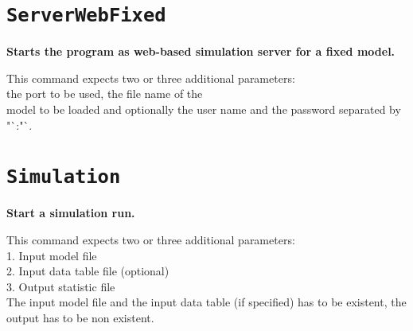 \section{\texttt{ServerWebFixed}}

\textbf{Starts the program as web-based simulation server for a fixed model.}

This command expects two or three additional parameters:\\
the port to be used, the file name of the\\
model to be loaded and optionally the user name and the password separated by "`:"`.

\section{\texttt{Simulation}}

\textbf{Start a simulation run.}

This command expects two or three additional parameters:\\
1. Input model file\\
2. Input data table file (optional)\\
3. Output statistic file\\
The input model file and the input data table (if specified) has to be existent, the output has to be non existent.

